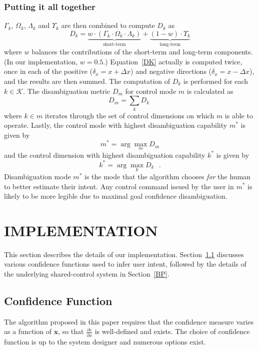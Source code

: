\documentclass[conference]{IEEEtran}
\newcommand{\argmax}{\arg\!\max}
\begin{document}
\subsubsection*{Putting it all together}
$\Gamma_k$, $\Omega_k$, $\Lambda_k$ and $\Upsilon_k$ are then combined to compute $D_{k}$ as 
\begin{equation}\label{DK}
D_{k} = \underbrace{w\cdot(\Gamma_k\cdot \Omega_k\cdot\Lambda_k)}_{\text{short-term}} + \underbrace{(1 - w)\cdot \Upsilon_k}_{\text{long-term}}
\end{equation}
where $w$ balances the contributions of the short-term and long-term components. (In our implementation, $w=0.5$.) Equation~\ref{DK} actually is computed twice, once in each of the positive ($\delta_x = x + \Delta x$) and negative directions ($\delta_x = x - \Delta x$), and the results are then summed. The computation of $D_k$ is performed for each $k \in \mathcal{K}$. The disambiguation metric $D_m$ for control mode $m$ is calculated as 
\begin{equation}\label{EQ2}
D_m = \sum_{k} D_{k} \;
\end{equation}
where $k \in m$ iterates through the set of control dimensions on which $m$ is able to operate.
Lastly, the control mode with highest disambiguation capability $m^*$ is given by
\begin{equation*}
m^* = \argmax_m  D_{m}
\end{equation*}
and the control dimension with highest disambiguation capability $k^{*}$ is given by
\begin{equation*}
k^* = \argmax_k D_k~~~.
\end{equation*}
Disambiguation mode $m^{*}$ is the mode that the algorithm chooses \textit{for} the human to better estimate their intent. Any control command issued by the user in $m^*$ is likely to be more legible due to maximal goal confidence disambiguation.

\section{IMPLEMENTATION}\label{IMPL}
This section describes the details of our implementation. Section~\ref{CF} discusses various confidence functions used to infer user intent, followed by the details of the underlying shared-control system in Section~\ref{BP}.
\subsection{Confidence Function}\label{CF}
The algorithm proposed in this paper requires that the confidence measure varies as a function of $\boldsymbol{x}$, so that $\frac{\partial c}{\partial x}$ is well-defined and exists. The choice of confidence function is up to the system designer and numerous options exist.
 
\end{document}
